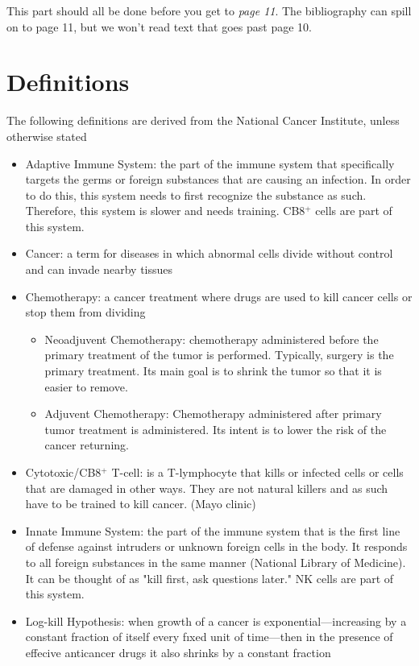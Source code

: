 \documentclass[11pt]{amsart}
\begin{document}
This part should all be done before you get to \emph{page 11}.  The bibliography can spill on to page 11, but we won't read text that goes past page 10.

\appendix
\section{Definitions}
\label{appendix: defs}
The following definitions are derived from the National Cancer Institute, unless otherwise stated
\begin{itemize}
	\item Adaptive Immune System: the part of the immune system that specifically targets the germs or foreign substances that are causing an infection. In order to do this, this system needs to first recognize the substance as such. Therefore, this system is slower and needs training. CB8$^+$ cells are part of this system.
	\item Cancer:  a term for diseases in which abnormal cells divide without control and can invade nearby tissues
	\item Chemotherapy: a cancer treatment where drugs are used to kill cancer cells or stop them from dividing
		\begin{itemize}
			\item Neoadjuvent Chemotherapy: chemotherapy administered before the primary treatment of the tumor is performed. Typically, surgery is the primary treatment. Its main goal is to shrink the tumor so that it is easier to remove.
			\item Adjuvent Chemotherapy: Chemotherapy administered after primary tumor treatment is administered. Its intent is to lower the risk of the cancer returning.
		\end{itemize}
	\item Cytotoxic/CB8$^+$ T-cell: is a T-lymphocyte that kills or infected cells or cells that are damaged in other ways. They are not natural killers and as such have to be trained to kill cancer. (Mayo clinic)
	\item Innate Immune System: the part of the immune system that is the first line of defense against intruders or unknown foreign cells in the body. It responds to all foreign substances in the same manner (National Library of Medicine). It can be thought of as "kill first, ask questions later." NK cells are part of this system.
	\item Log-kill Hypothesis: when growth of a cancer is exponential—increasing by a constant fraction of itself every fıxed unit of time—then in the presence of effecive anticancer drugs it also shrinks by a constant fraction \cite{LogKill}

\end{itemize}
\end{document}
